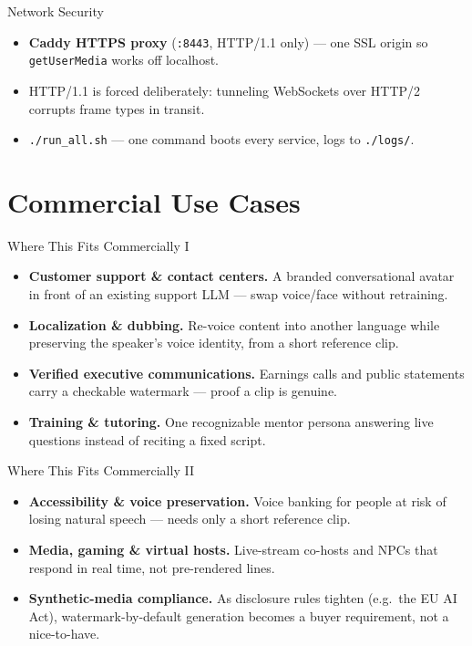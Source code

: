 \documentclass[11pt]{beamer}
\begin{document}
\begin{frame}[fragile]{Network Security}
  \begin{itemize}
    \item \textbf{Caddy HTTPS proxy} (\texttt{:8443}, HTTP/1.1 only) --- one SSL origin so \texttt{getUserMedia} works off localhost.
    \item HTTP/1.1 is forced deliberately: tunneling WebSockets over HTTP/2 corrupts frame types in transit.
    \item \texttt{./run\_all.sh} --- one command boots every service, logs to \texttt{./logs/}.
  \end{itemize}
\end{frame}

\section{Commercial Use Cases}

\begin{frame}{Where This Fits Commercially I}
  \begin{itemize}
    \item \textbf{Customer support \& contact centers.} A branded conversational avatar in front of an existing support LLM --- swap voice/face without retraining.
    \item \textbf{Localization \& dubbing.} Re-voice content into another language while preserving the speaker's voice identity, from a short reference clip.
    \item \textbf{Verified executive communications.} Earnings calls and public statements carry a checkable watermark --- proof a clip is genuine.
    \item \textbf{Training \& tutoring.} One recognizable mentor persona answering live questions instead of reciting a fixed script.
  \end{itemize}
\end{frame}

\begin{frame}{Where This Fits Commercially II}
  \begin{itemize}
    \item \textbf{Accessibility \& voice preservation.} Voice banking for people at risk of losing natural speech --- needs only a short reference clip.
    \item \textbf{Media, gaming \& virtual hosts.} Live-stream co-hosts and NPCs that respond in real time, not pre-rendered lines.
    \item \textbf{Synthetic-media compliance.} As disclosure rules tighten (e.g.\ the EU AI Act), watermark-by-default generation becomes a buyer requirement, not a nice-to-have.
  \end{itemize}
\end{frame}
\end{document}
